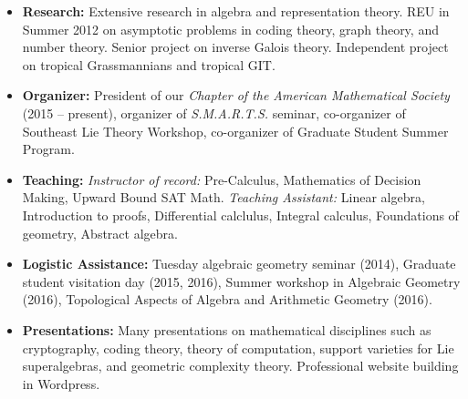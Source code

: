 \documentclass[10pt,a4paper]{article}
\begin{document}
\begin{itemize}
  \item \textbf{Research:} Extensive research in algebra and representation theory. REU in Summer 2012 on asymptotic problems in coding theory, graph theory, and number theory. Senior project on inverse Galois theory. Independent project on tropical Grassmannians and tropical GIT.
\item \textbf{Organizer:} President of our \emph{Chapter of the American Mathematical Society} (2015 -- present), organizer of \emph{S.M.A.R.T.S.} seminar, co-organizer of Southeast Lie Theory Workshop, co-organizer of Graduate Student Summer Program.
\item \textbf{Teaching:} \emph{Instructor of record:} Pre-Calculus, Mathematics of Decision Making, Upward Bound SAT Math. \emph{Teaching Assistant:} Linear algebra, Introduction to proofs, Differential calclulus, Integral calculus, Foundations of geometry, Abstract algebra.
\item \textbf{Logistic Assistance:} Tuesday algebraic geometry seminar (2014), Graduate student visitation day (2015, 2016), Summer workshop in Algebraic Geometry (2016), Topological Aspects of Algebra and Arithmetic Geometry (2016).
\item \textbf{Presentations:} Many presentations on mathematical disciplines such as cryptography, coding theory, theory of computation, support varieties for Lie superalgebras, and geometric complexity theory. Professional website building in Wordpress. 
\end{itemize}
\end{document}
